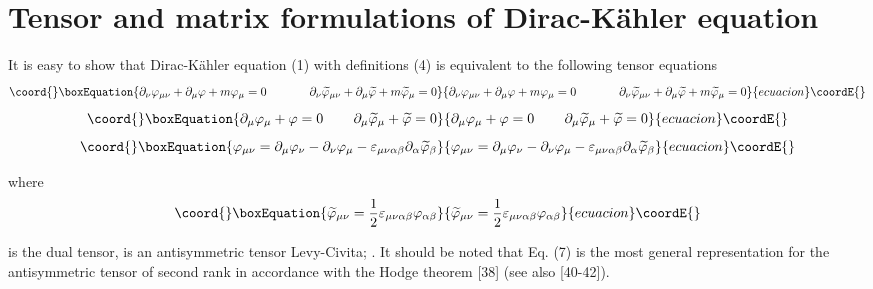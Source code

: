 \documentclass[a4paper,12pt]{article}
\begin{document}
\section{Tensor and matrix formulations of Dirac-K\"ahler
equation}

It is easy to show that Dirac-K\"ahler equation (1) with definitions (4) is
equivalent to the following tensor equations
\begin{equation}\coord{}\boxEquation{
\partial _\nu \varphi _{\mu \nu }+\partial _\mu \varphi +m\varphi _\mu =0
\hspace{0.5in}\partial _\nu \widetilde{\varphi }_{\mu \nu }+\partial _\mu
\widetilde{\varphi }+m\widetilde{\varphi }_\mu =0  \label{5}
}{
\partial _\nu \varphi _{\mu \nu }+\partial _\mu \varphi +m\varphi _\mu =0
\hspace{0.5in}\partial _\nu \widetilde{\varphi }_{\mu \nu }+\partial _\mu
\widetilde{\varphi }+m\widetilde{\varphi }_\mu =0  }{ecuacion}\coordE{}\end{equation}
\begin{equation}\coord{}\boxEquation{
\partial _\mu \varphi _\mu +\varphi =0\hspace{0.3in}\partial _\mu \widetilde{
\varphi }_\mu +\widetilde{\varphi }=0  \label{6}
}{
\partial _\mu \varphi _\mu +\varphi =0\hspace{0.3in}\partial _\mu \widetilde{
\varphi }_\mu +\widetilde{\varphi }=0  }{ecuacion}\coordE{}\end{equation}
\begin{equation}\coord{}\boxEquation{
\varphi _{\mu \nu }=\partial _\mu \varphi _\nu -\partial _\nu
\varphi _\mu -\varepsilon _{\mu \nu \alpha \beta }\partial _\alpha
\widetilde{\varphi } _\beta  \label{7}
}{
\varphi _{\mu \nu }=\partial _\mu \varphi _\nu -\partial _\nu
\varphi _\mu -\varepsilon _{\mu \nu \alpha \beta }\partial _\alpha
\widetilde{\varphi } _\beta  }{ecuacion}\coordE{}\end{equation}

where
\begin{equation}\coord{}\boxEquation{
\widetilde{\varphi }_{\mu \nu }=\frac 12\varepsilon _{\mu \nu \alpha \beta
}\varphi _{\alpha \beta }  \label{8}
}{
\widetilde{\varphi }_{\mu \nu }=\frac 12\varepsilon _{\mu \nu \alpha \beta
}\varphi _{\alpha \beta }  }{ecuacion}\coordE{}\end{equation}

is the dual tensor, \myHighlight{$\varepsilon _{\mu \nu \alpha \beta }$}\coordHE{} is an
antisymmetric tensor Levy-Civita; \coordHE{}. It should be
noted that Eq. (7) is the most general representation for the antisymmetric
tensor of second rank in accordance with the Hodge theorem [38] (see also
[40-42]).
\end{document}
